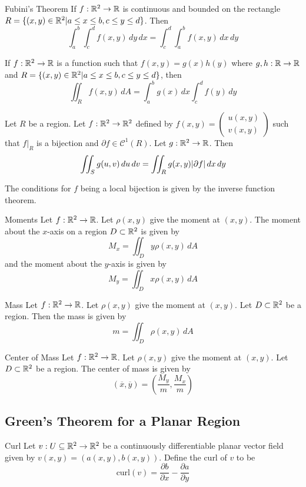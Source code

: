 \documentclass[a4paper]{article}
\begin{document}
\begin{prp}{Fubini's Theorem}{} If $f:\mathbb{R}^2\to\mathbb{R}$ is continuous and bounded on the rectangle $R=\{(x,y)\in\mathbb{R}^2|a\leq x\leq b, c\leq y\leq d\}$. Then $$\int_a^b\int_c^df(x,y)\,dy\,dx=\int_c^d\int_a^bf(x,y)\,dx\,dy$$
\end{prp}

\begin{prp}{}{} If $f:\mathbb{R}^2\to\mathbb{R}$ is a function such that $f(x,y)=g(x)h(y)$ where $g,h:\mathbb{R}\to\mathbb{R}$ and $R=\{(x,y)\in\mathbb{R}^2|a\leq x\leq b, c\leq y\leq d\}$, then $$\iint_Rf(x,y)\,dA=\int_a^bg(x)\,dx\int_c^df(y)\,dy$$
\end{prp}

\begin{thm}{}{} Let $R$ be a region. Let $f:\mathbb{R}^2\to\mathbb{R}^2$ defined by $f(x,y)=\begin{pmatrix}u(x,y)\\v(x,y)\end{pmatrix}$ such that $f|_R$ is a bijection and $\partial f\in\mathcal{C}^1(R)$. Let $g:\mathbb{R}^2\to\mathbb{R}$. Then $$\iint_Sg(u,v)\,du\,dv=\iint_Rg(x,y)\abs{\partial f}\,dx\,dy$$
\end{thm}

The conditions for $f$ being a local bijection is given by the inverse function theorem. 

\begin{thm}{Moments}{} Let $f:\mathbb{R}^2\to\mathbb{R}$. Let $\rho(x,y)$ give the moment at $(x,y)$. The moment about the $x$-axis on a region $D\subset\mathbb{R}^2$ is given by $$M_x=\iint_Dy\rho(x,y)\,dA$$ and the moment about the $y$-axis is given by $$M_y=\iint_Dx\rho(x,y)\,dA$$
\end{thm}

\begin{thm}{Mass}{} Let $f:\mathbb{R}^2\to\mathbb{R}$. Let $\rho(x,y)$ give the moment at $(x,y)$. Let $D\subset\mathbb{R}^2$ be a region. Then the mass is given by $$m=\iint_D\rho(x,y)\,dA$$
\end{thm}

\begin{thm}{Center of Mass}{} Let $f:\mathbb{R}^2\to\mathbb{R}$. Let $\rho(x,y)$ give the moment at $(x,y)$. Let $D\subset\mathbb{R}^2$ be a region. The center of mass is given by $$(\overline{x},\overline{y})=\left(\frac{M_y}{m},\frac{M_x}{m}\right)$$
\end{thm}

\subsection{Green's Theorem for a Planar Region}
\begin{defn}{Curl}{} Let $v:U\subseteq\mathbb{R}^2\to\mathbb{R}^2$ be a continuously differentiable planar vector field given by $v(x,y)=\left(a(x,y),b(x,y)\right)$. Define the curl of $v$ to be $$\text{curl}(v)=\frac{\partial b}{\partial x}-\frac{\partial a}{\partial y}$$
\end{defn}
\end{document}
